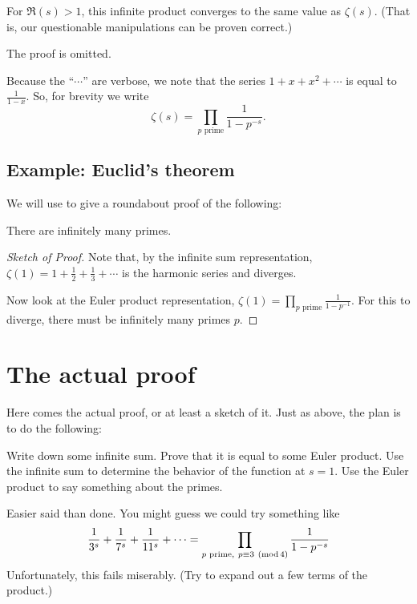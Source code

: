\begin{theorem}
	\label{thm:riemann_zeta_product_rep}
	For $\Re(s) > 1$, this infinite product converges to the same value as $\zeta(s)$.
	(That is, our questionable manipulations can be proven correct.)
\end{theorem}
The proof is omitted.

Because the ``$\cdots$'' are verbose,
we note that the series $1 + x + x^2 + \cdots$ is equal to $\frac{1}{1-x}$.
So, for brevity we write
\[ \zeta(s) = \prod_{p\text{ prime}} \frac{1}{1-p^{-s}}. \]

\subsection{Example: Euclid's theorem}

We will use  to give a roundabout proof of the following:
\begin{theorem}
	There are infinitely many primes.
\end{theorem}

\begin{proof}[Sketch of Proof]
	Note that, by the infinite sum representation,
	$\zeta(1) = 1+\frac{1}{2}+\frac{1}{3}+\cdots$ is the harmonic series and diverges.

	Now look at the Euler product representation,
	$\zeta(1) = \prod_{p\text{ prime}} \frac{1}{1-p^{-1}}$.
	For this to diverge, there must be infinitely many primes $p$.
\end{proof}

\section{The actual proof}

Here comes the actual proof, or at least a sketch of it.
Just as above, the plan is to do the following:
\begin{itemize}
	\ii Write down some infinite sum.
	\ii Prove that it is equal to some Euler product.
	\ii Use the infinite sum to determine the behavior of the function at $s = 1$.
	\ii Use the Euler product to say something about the primes.
\end{itemize}

Easier said than done.
You might guess we could try something like
\[
	\frac{1}{3^s} + \frac{1}{7^s} + \frac{1}{11^s} + \cdots =
	\prod_{p\text{ prime},\ p \equiv 3 \ (\operatorname{mod} 4)} \frac{1}{1-p^{-s}}
\]
Unfortunately, this fails miserably. (Try to expand out a few terms of the product.)

